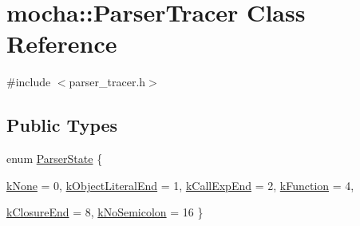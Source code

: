 \hypertarget{classmocha_1_1_parser_tracer}{
\section{mocha::ParserTracer Class Reference}
\label{classmocha_1_1_parser_tracer}
}


{\ttfamily \#include $<$parser\_\-tracer.h$>$}

\subsection*{Public Types}
\begin{DoxyCompactItemize}
\item 
enum \hyperlink{classmocha_1_1_parser_tracer_afe3c94bff7f4cd17fd2f457f92fcf713}{ParserState} \{ \par
\hyperlink{classmocha_1_1_parser_tracer_afe3c94bff7f4cd17fd2f457f92fcf713a5767dc3b56f89f3c5f228e2a8b7f2d92}{kNone} =  0, 
\hyperlink{classmocha_1_1_parser_tracer_afe3c94bff7f4cd17fd2f457f92fcf713a0d72bbf87897069035f8f61e0b4a3943}{kObjectLiteralEnd} =  1, 
\hyperlink{classmocha_1_1_parser_tracer_afe3c94bff7f4cd17fd2f457f92fcf713adc3207761ea23eee8c06cf4e593bab20}{kCallExpEnd} =  2, 
\hyperlink{classmocha_1_1_parser_tracer_afe3c94bff7f4cd17fd2f457f92fcf713a4c6adc797564ee85392770850e7d5c0d}{kFunction} =  4, 
\par
\hyperlink{classmocha_1_1_parser_tracer_afe3c94bff7f4cd17fd2f457f92fcf713a97fbd1f765965f719e33435c80e0b036}{kClosureEnd} =  8, 
\hyperlink{classmocha_1_1_parser_tracer_afe3c94bff7f4cd17fd2f457f92fcf713afb07e3bd42a4667f1c1d0551988f11c7}{kNoSemicolon} =  16
 \}
\end{DoxyCompactItemize}
